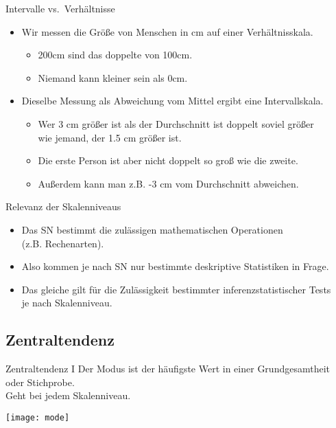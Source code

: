 \begin{frame}
  {Intervalle vs.\ Verhältnisse}
  \begin{itemize}[<+->]
    \item Wir messen die Größe von Menschen in cm auf einer Verhältnisskala.
      \begin{itemize}[<+->]
	\item 200cm sind das doppelte von 100cm.
	\item Niemand kann kleiner sein als 0cm. 
      \end{itemize}
      \vspace{0.5cm}
    \item Dieselbe Messung als \alert{Abweichung vom Mittel} ergibt eine Intervallskala.
      \begin{itemize}[<+->]
	\item Wer 3 cm größer ist als der Durchschnitt ist doppelt soviel größer\\
	  wie jemand, der 1.5 cm größer ist.
	\item Die erste Person ist aber nicht doppelt so groß wie die zweite.
	\item Außerdem kann man z.B. -3 cm vom Durchschnitt abweichen.
      \end{itemize}
  \end{itemize}
\end{frame}

\begin{frame}
  {Relevanz der Skalenniveaus}
  \begin{itemize}[<+->]
    \item Das SN bestimmt die \alert{zulässigen mathematischen Operationen}\\
      (z.B. Rechenarten).
    \item Also kommen je nach SN nur bestimmte \alert{deskriptive Statistiken} in Frage.
    \item Das gleiche gilt für die Zulässigkeit bestimmter \alert{inferenzstatistischer Tests}\\
      je nach Skalenniveau.
  \end{itemize}
\end{frame}


\subsection{Zentraltendenz}

\begin{frame}
  {Zentraltendenz I}
  Der \alert{Modus} ist der \alert{häufigste Wert} in einer Grundgesamtheit oder Stichprobe.\\
  \alert{Geht bei jedem Skalenniveau.}
  \vspace{-2cm}
  \begin{center}
    \texttt{[image: mode]}
  \end{center}
\end{frame}


